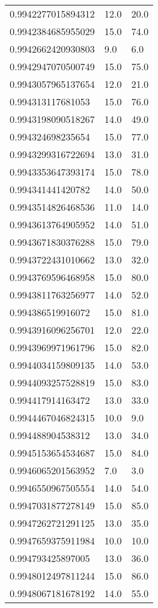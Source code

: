 \begin{center}
\begin{supertabular}[H]{p{0.30\textwidth}p{0.05\textwidth}p{0.05\textwidth}}
0.9942277015894312 & 12.0 & 20.0 \\ 
0.9942384685955029 & 15.0 & 74.0 \\ 
0.9942662420930803 & 9.0 & 6.0 \\ 
0.9942947070500749 & 15.0 & 75.0 \\ 
0.9943057965137654 & 12.0 & 21.0 \\ 
0.994313117681053 & 15.0 & 76.0 \\ 
0.9943198090518267 & 14.0 & 49.0 \\ 
0.994324698235654 & 15.0 & 77.0 \\ 
0.9943299316722694 & 13.0 & 31.0 \\ 
0.9943353647393174 & 15.0 & 78.0 \\ 
0.994341441420782 & 14.0 & 50.0 \\ 
0.9943514826468536 & 11.0 & 14.0 \\ 
0.9943613764905952 & 14.0 & 51.0 \\ 
0.9943671830376288 & 15.0 & 79.0 \\ 
0.9943722431010662 & 13.0 & 32.0 \\ 
0.9943769596468958 & 15.0 & 80.0 \\ 
0.9943811763256977 & 14.0 & 52.0 \\ 
0.994386519916072 & 15.0 & 81.0 \\ 
0.9943916096256701 & 12.0 & 22.0 \\ 
0.9943969971961796 & 15.0 & 82.0 \\ 
0.9944034159809135 & 14.0 & 53.0 \\ 
0.9944093257528819 & 15.0 & 83.0 \\ 
0.994417914163472 & 13.0 & 33.0 \\ 
0.9944467046824315 & 10.0 & 9.0 \\ 
0.994488904538312 & 13.0 & 34.0 \\ 
0.9945153654534687 & 15.0 & 84.0 \\ 
0.9946065201563952 & 7.0 & 3.0 \\ 
0.9946550967505554 & 14.0 & 54.0 \\ 
0.9947031877278149 & 15.0 & 85.0 \\ 
0.9947262721291125 & 13.0 & 35.0 \\ 
0.9947659375911984 & 10.0 & 10.0 \\ 
0.994793425897005 & 13.0 & 36.0 \\ 
0.9948012497811244 & 15.0 & 86.0 \\ 
0.9948067181678192 & 14.0 & 55.0 \\ 

\end{supertabular}
\end{center}
